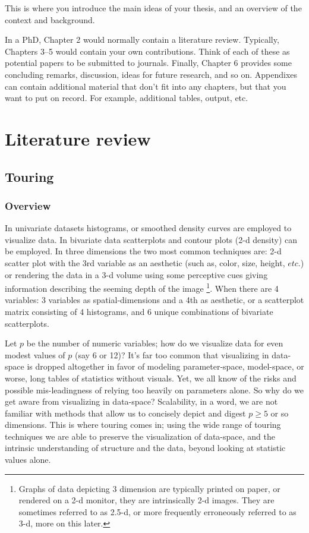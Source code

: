 \documentclass{monashthesis}
\begin{document}
This is where you introduce the main ideas of your thesis, and an
overview of the context and background.

In a PhD, Chapter 2 would normally contain a literature review.
Typically, Chapters 3--5 would contain your own contributions. Think of
each of these as potential papers to be submitted to journals. Finally,
Chapter 6 provides some concluding remarks, discussion, ideas for future
research, and so on. Appendixes can contain additional material that
don't fit into any chapters, but that you want to put on record. For
example, additional tables, output, etc.

\chapter{Literature review}\label{ch:lit_review}

\section{Touring}\label{sec:tour}

\subsection{Overview}\label{overview}

In univariate datasets histograms, or smoothed density curves are
employed to visualize data. In bivariate data scatterplots and contour
plots (2-d density) can be employed. In three dimensions the two most
common techniques are: 2-d scatter plot with the 3rd variable as an
aesthetic (such as, color, size, height, \(etc.\)) or rendering the data
in a 3-d volume using some perceptive cues giving information describing
the seeming depth of the image
\footnote{Graphs of data depicting 3 dimension are typically printed on paper, or rendered on a 2-d monitor, they are intrinsically 2-d images. They are sometimes referred to as 2.5-d, or more frequently erroneously referred to as 3-d, more on this later.}.
When there are 4 variables: 3 variables as spatial-dimensions and a 4th
as aesthetic, or a scatterplot matrix consisting of 4 histograms, and 6
unique combinations of bivariate scatterplots.

Let \(p\) be the number of numeric variables; how do we visualize data
for even modest values of \(p\) (say 6 or 12)? It's far too common that
visualizing in data-space is dropped altogether in favor of modeling
parameter-space, model-space, or worse, long tables of statistics
without visuals\autocite{wickham_visualizing_2015}. Yet, we all know of
the risks and possible mis-leadingness of relying too heavily on
parameters alone\autocites{anscombe_graphs_1973}{matejka_same_2017}. So
why do we get aware from visualizing in data-space? Scalability, in a
word, we are not familiar with methods that allow us to concisely depict
and digest \(p \geq 5\) or so dimensions. This is where touring comes
in; using the wide range of touring techniques we are able to preserve
the visualization of data-space, and the intrinsic understanding of
structure and the data, beyond looking at statistic values alone.
\end{document}
